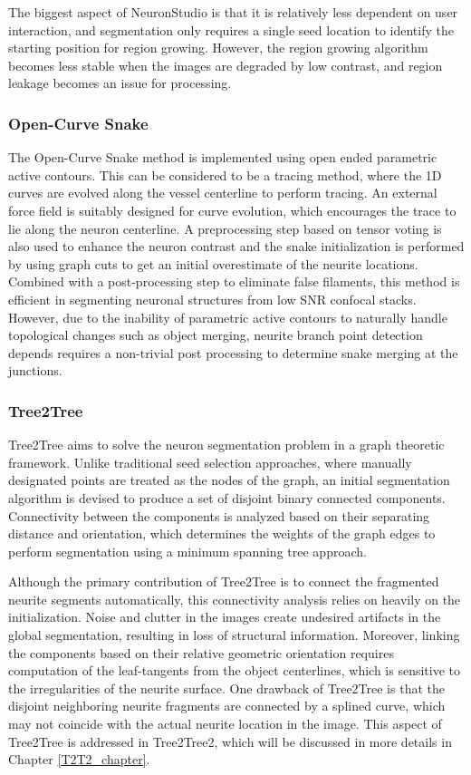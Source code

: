 The biggest aspect of NeuronStudio is that it is relatively less dependent on user interaction, and segmentation only requires a single seed location to identify the starting position for region growing. However, the region growing algorithm becomes less stable when the images are degraded by low contrast, and region leakage becomes an issue for processing.

\subsubsection{Open-Curve Snake}
The Open-Curve Snake method\cite{wang_Roysam_open_curve,cai_ISBI} is implemented using open ended parametric active contours. This can be considered to be a tracing method, where the 1D curves are evolved along the vessel centerline to perform tracing. An external force field is suitably designed for curve evolution, which encourages the trace to lie along the neuron centerline. A preprocessing step based on tensor voting \cite{roysam_tensorvoting} is also used to enhance the neuron contrast and the snake initialization is performed by using graph cuts\cite{graph_cut} to get an initial overestimate of the neurite locations. Combined with a post-processing step to eliminate false filaments, this method is efficient in segmenting neuronal structures from low SNR confocal stacks. However, due to the inability of parametric active contours to naturally handle topological changes such as object merging, neurite branch point detection depends requires a non-trivial post processing to determine snake merging at the junctions.
 
\subsubsection{Tree2Tree}
Tree2Tree \cite{basu_T2T_journal} aims to solve the neuron segmentation problem in a graph theoretic framework. Unlike traditional seed selection approaches, where manually designated points are treated as the nodes of the graph, an initial segmentation algorithm is devised to produce a set of disjoint binary connected components. Connectivity between the components is analyzed based on their separating distance and orientation, which determines the weights of the graph edges to perform segmentation using a minimum spanning tree approach. 

Although the primary contribution of Tree2Tree is to connect the fragmented neurite segments automatically, this connectivity analysis relies on heavily on the initialization. Noise and clutter in the images create undesired artifacts in the global segmentation, resulting in loss of structural information. Moreover, linking the components based on their relative geometric orientation requires computation of the leaf-tangents from the object centerlines, which is sensitive to the irregularities of the neurite surface. One drawback of Tree2Tree is that the disjoint neighboring neurite fragments are connected by a splined curve, which may not coincide with the actual neurite location in the image. This aspect of Tree2Tree is addressed in Tree2Tree2\cite{mukherjee_T2T_2}, which will be discussed in more details in Chapter  \ref{T2T2_chapter}.

